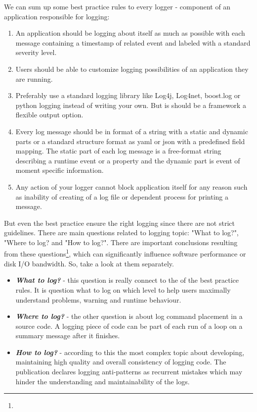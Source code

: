We can sum up some best practice rules to every logger - component of an application responsible for logging: 
\begin{enumerate}
    \item An application should be logging about itself as much as possible with each message containing a timestamp of related event and labeled with a standard severity level.
    \item Users should be able to customize logging possibilities of an application they are running.
    \item Preferably use a standard logging library like Log4j, Log4net, boost.log or python logging instead of writing your own. But is should be a framework  a flexible output option.
    \item Every log message should be in format of a  string with a static and dynamic parts or a standard structure format as yaml or json with a predefined field mapping. The static part of each log message is a free-format string describing a runtime event or a property and the dynamic part is event of moment specific information. 
    \item Any action of your logger cannot block application itself for any reason such as inability of creating of a log file or dependent process for printing a message.
\end{enumerate}

But even the best practice  ensure the right logging since there are not strict guidelines. There are  main questions related to logging topic: "What to log?", "Where to log? and "How to log?". There are important conclusions resulting from these questions\footnote{}, which can significantly influence software performance or disk I/O bandwidth. So,  take a look at them separately.

\begin{itemize}
    \item \textbf{\textit{What to log?}} - this question is really connect to the  of the best practice rules. It is  question what to log on which level to help users maximally understand problems, warning and runtime behaviour. 
    \item \textbf{\textit{Where to log?}} - the other question is about log command placement in a source code. A logging piece of code can be part of each run of a loop on a summary message after it finishes. 
    \item \textbf{\textit{How to log?}} - according to \cite{chen2017characterizing} this the most complex topic about developing, maintaining high quality and overall consistency of logging code. The publication declares logging anti-patterns as recurrent mistakes which may hinder the understanding and maintainability of the logs.
\end{itemize}

